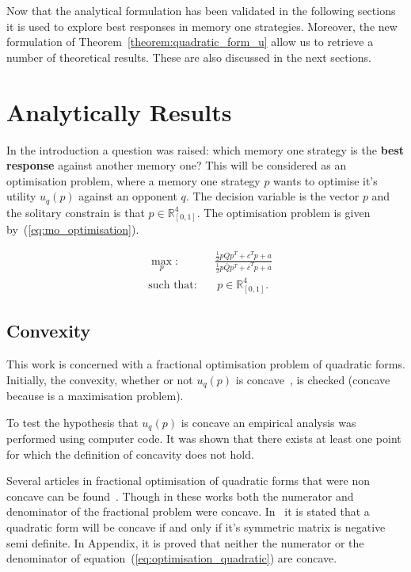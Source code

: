 \documentclass[10pt]{article}
\newcommand{\R}{\mathbb{R}}
\begin{document}
Now that the analytical formulation has been validated in the following sections
it is used to explore best responses in memory one strategies. Moreover, the new
formulation of Theorem~\ref{theorem:quadratic_form_u} allow us to retrieve a number
of theoretical results. These are also discussed in the next sections.

\section{Analytically Results}\label{section:analytical_results}

In the introduction a question was raised: which memory one strategy is the \textbf{best response}
against another memory one? This will be considered as an optimisation problem,
where a memory one strategy \(p\) wants to optimise it's utility \(u_q(p)\)
against an opponent \(q\). The decision variable is the vector \(p\) and the
solitary constrain is that \(p \in \R^4_{[0, 1]} \). The optimisation problem is
given by~(\ref{eq:mo_optimisation}).

\begin{equation}\label{eq:mo_optimisation}
\begin{aligned}
& \max_p: && \frac{\frac{1}{2}  p  Q  p^T + c^T p + a} 
                  {\frac{1}{2}  p  \bar{Q}  p^T + \bar{c}^T  p + \bar{a}}
\\
& \text{such that}: && \ p \in \R^4_{[0, 1]}.
\end{aligned}
\end{equation}

\subsection{Convexity}

This work is concerned with a fractional optimisation problem of quadratic forms.
Initially, the convexity, whether or not \(u_{q}(p)\) is concave~\cite{Gradshteyn2007},
is checked (concave because is a maximisation problem).

To test the hypothesis that \(u_q(p)\) is concave an empirical analysis
was performed using computer code. %
It was shown that there exists at least one point for which the definition of
concavity does not hold.

Several articles in fractional optimisation of quadratic forms that were non concave
can be found~\cite{Beck2009, Hongyan2014}. Though in these works both the numerator
and denominator of the fractional problem were concave. In~\cite{Anton2014} it is
stated that a quadratic form will be concave if and only if it's symmetric matrix is
negative semi definite. In Appendix, it is proved that neither the numerator or %
the denominator of equation~(\ref{eq:optimisation_quadratic}) are concave.
\end{document}
